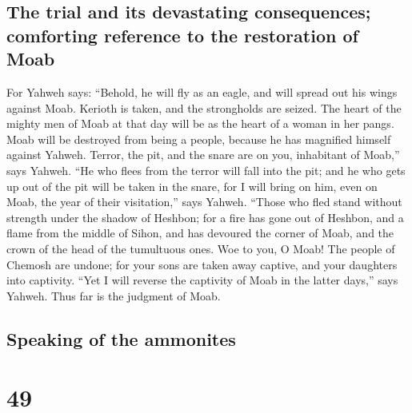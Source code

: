 \hypertarget{the-trial-and-its-devastating-consequences-comforting-reference-to-the-restoration-of-moab}{%
\subsection{The trial and its devastating consequences; comforting
reference to the restoration of
Moab}\label{the-trial-and-its-devastating-consequences-comforting-reference-to-the-restoration-of-moab}}

 For Yahweh says: ``Behold, he will fly as an eagle, and
will spread out his wings against Moab.  Kerioth is
taken, and the strongholds are seized. The heart of the mighty men of
Moab at that day will be as the heart of a woman in her pangs.
 Moab will be destroyed from being a people, because he
has magnified himself against Yahweh.  Terror, the pit,
and the snare are on you, inhabitant of Moab,'' says Yahweh.
 ``He who flees from the terror will fall into the pit;
and he who gets up out of the pit will be taken in the snare, for I will
bring on him, even on Moab, the year of their visitation,'' says Yahweh.
 ``Those who fled stand without strength under the shadow
of Heshbon; for a fire has gone out of Heshbon, and a flame from the
middle of Sihon, and has devoured the corner of Moab, and the crown of
the head of the tumultuous ones.  Woe to you, O Moab! The
people of Chemosh are undone; for your sons are taken away captive, and
your daughters into captivity.  ``Yet I will reverse the
captivity of Moab in the latter days,'' says Yahweh. Thus far is the
judgment of Moab.

\hypertarget{speaking-of-the-ammonites}{%
\subsection{Speaking of the ammonites}\label{speaking-of-the-ammonites}}

\hypertarget{section-48}{%
\section{49}\label{section-48}}

